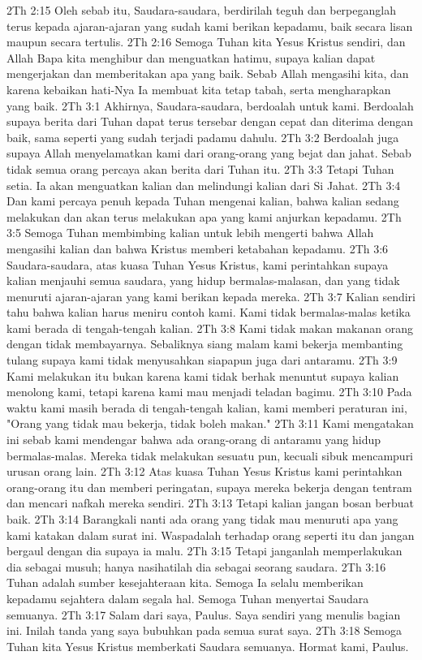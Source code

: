 2Th 2:15  Oleh sebab itu, Saudara-saudara, berdirilah teguh dan berpeganglah terus kepada ajaran-ajaran yang sudah kami berikan kepadamu, baik secara lisan maupun secara tertulis.
2Th 2:16  Semoga Tuhan kita Yesus Kristus sendiri, dan Allah Bapa kita menghibur dan menguatkan hatimu, supaya kalian dapat mengerjakan dan memberitakan apa yang baik. Sebab Allah mengasihi kita, dan karena kebaikan hati-Nya Ia membuat kita tetap tabah, serta mengharapkan yang baik.
2Th 3:1  Akhirnya, Saudara-saudara, berdoalah untuk kami. Berdoalah supaya berita dari Tuhan dapat terus tersebar dengan cepat dan diterima dengan baik, sama seperti yang sudah terjadi padamu dahulu.
2Th 3:2  Berdoalah juga supaya Allah menyelamatkan kami dari orang-orang yang bejat dan jahat. Sebab tidak semua orang percaya akan berita dari Tuhan itu.
2Th 3:3  Tetapi Tuhan setia. Ia akan menguatkan kalian dan melindungi kalian dari Si Jahat.
2Th 3:4  Dan kami percaya penuh kepada Tuhan mengenai kalian, bahwa kalian sedang melakukan dan akan terus melakukan apa yang kami anjurkan kepadamu.
2Th 3:5  Semoga Tuhan membimbing kalian untuk lebih mengerti bahwa Allah mengasihi kalian dan bahwa Kristus memberi ketabahan kepadamu.
2Th 3:6  Saudara-saudara, atas kuasa Tuhan Yesus Kristus, kami perintahkan supaya kalian menjauhi semua saudara, yang hidup bermalas-malasan, dan yang tidak menuruti ajaran-ajaran yang kami berikan kepada mereka.
2Th 3:7  Kalian sendiri tahu bahwa kalian harus meniru contoh kami. Kami tidak bermalas-malas ketika kami berada di tengah-tengah kalian.
2Th 3:8  Kami tidak makan makanan orang dengan tidak membayarnya. Sebaliknya siang malam kami bekerja membanting tulang supaya kami tidak menyusahkan siapapun juga dari antaramu.
2Th 3:9  Kami melakukan itu bukan karena kami tidak berhak menuntut supaya kalian menolong kami, tetapi karena kami mau menjadi teladan bagimu.
2Th 3:10  Pada waktu kami masih berada di tengah-tengah kalian, kami memberi peraturan ini, "Orang yang tidak mau bekerja, tidak boleh makan."
2Th 3:11  Kami mengatakan ini sebab kami mendengar bahwa ada orang-orang di antaramu yang hidup bermalas-malas. Mereka tidak melakukan sesuatu pun, kecuali sibuk mencampuri urusan orang lain.
2Th 3:12  Atas kuasa Tuhan Yesus Kristus kami perintahkan orang-orang itu dan memberi peringatan, supaya mereka bekerja dengan tentram dan mencari nafkah mereka sendiri.
2Th 3:13  Tetapi kalian jangan bosan berbuat baik.
2Th 3:14  Barangkali nanti ada orang yang tidak mau menuruti apa yang kami katakan dalam surat ini. Waspadalah terhadap orang seperti itu dan jangan bergaul dengan dia supaya ia malu.
2Th 3:15  Tetapi janganlah memperlakukan dia sebagai musuh; hanya nasihatilah dia sebagai seorang saudara.
2Th 3:16  Tuhan adalah sumber kesejahteraan kita. Semoga Ia selalu memberikan kepadamu sejahtera dalam segala hal. Semoga Tuhan menyertai Saudara semuanya.
2Th 3:17  Salam dari saya, Paulus. Saya sendiri yang menulis bagian ini. Inilah tanda yang saya bubuhkan pada semua surat saya.
2Th 3:18  Semoga Tuhan kita Yesus Kristus memberkati Saudara semuanya. Hormat kami, Paulus.


